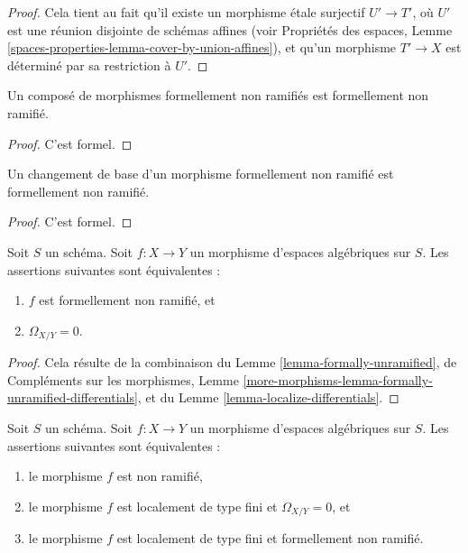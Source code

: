 \begin{proof}
Cela tient au fait qu'il existe un morphisme étale surjectif
$U' \to T'$, où $U'$ est une réunion disjointe de schémas affines (voir
Propriétés des espaces, Lemme
\ref{spaces-properties-lemma-cover-by-union-affines}),
et qu'un morphisme $T' \to X$ est déterminé par sa restriction à $U'$.
\end{proof}

\begin{lemma}
\label{lemma-composition-formally-unramified}
Un composé de morphismes formellement non ramifiés est formellement non ramifié.
\end{lemma}

\begin{proof}
C'est formel.
\end{proof}

\begin{lemma}
\label{lemma-base-change-formally-unramified}
Un changement de base d'un morphisme formellement non ramifié est formellement non ramifié.
\end{lemma}

\begin{proof}
C'est formel.
\end{proof}

\begin{lemma}
\label{lemma-characterize-formally-unramified}
Soit $S$ un schéma. Soit $f : X \to Y$ un morphisme d'espaces algébriques sur
$S$. Les assertions suivantes sont équivalentes :
\begin{enumerate}
\item $f$ est formellement non ramifié, et
\item $\Omega_{X/Y} = 0$.
\end{enumerate}
\end{lemma}

\begin{proof}
Cela résulte de la combinaison du
Lemme \ref{lemma-formally-unramified},
de Compléments sur les morphismes,
Lemme \ref{more-morphisms-lemma-formally-unramified-differentials},
et du
Lemme \ref{lemma-localize-differentials}.
\end{proof}

\begin{lemma}
\label{lemma-unramified-formally-unramified}
Soit $S$ un schéma.
Soit $f : X \to Y$ un morphisme d'espaces algébriques sur $S$.
Les assertions suivantes sont équivalentes :
\begin{enumerate}
\item le morphisme $f$ est non ramifié,
\item le morphisme $f$ est localement de type fini et $\Omega_{X/Y} = 0$, et
\item le morphisme $f$ est localement de type fini et formellement non ramifié.
\end{enumerate}
\end{lemma}

